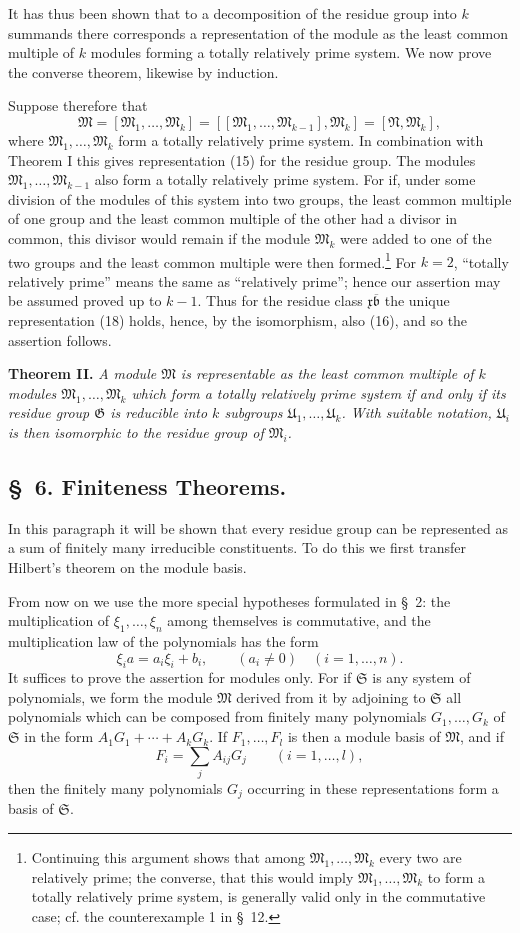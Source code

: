 \documentclass[11pt]{article}
\newcommand{\mM}{\mathfrak{M}}
\newcommand{\mN}{\mathfrak{N}}
\newcommand{\mG}{\mathfrak{G}}
\newcommand{\mb}{\mathfrak{b}}
\newcommand{\mx}{\mathfrak{x}}
\newcommand{\mU}{\mathfrak{U}}
\newcommand{\mS}{\mathfrak{S}}
\begin{document}
It has thus been shown that to a decomposition of the residue group into $k$ summands there corresponds a representation of the module as the least common multiple of $k$ modules forming a totally relatively prime system. We now prove the converse theorem, likewise by induction.

Suppose therefore that
\[
 \mM=[\mM_1,\ldots,\mM_k]=[[\mM_1,\ldots,\mM_{k-1}],\mM_k]=[\mN,\mM_k],
\]
where $\mM_1,
\ldots,\mM_k$ form a totally relatively prime system. In combination with Theorem I this gives representation (15) for the residue group. The modules $\mM_1,
\ldots,\mM_{k-1}$ also form a totally relatively prime system. For if, under some division of the modules of this system into two groups, the least common multiple of one group and the least common multiple of the other had a divisor in common, this divisor would remain if the module $\mM_k$ were added to one of the two groups and the least common multiple were then formed.\footnote{Continuing this argument shows that among $\mM_1,
\ldots,\mM_k$ every two are relatively prime; the converse, that this would imply $\mM_1,
\ldots,\mM_k$ to form a totally relatively prime system, is generally valid only in the commutative case; cf. the counterexample 1 in \S~12.} For $k=2$, ``totally relatively prime'' means the same as ``relatively prime''; hence our assertion may be assumed proved up to $k-1$. Thus for the residue class $\mx\overline{\mb}$ the unique representation (18) holds, hence, by the isomorphism, also (16), and so the assertion follows.

\textbf{Theorem II.} \emph{A module $\mM$ is representable as the least common multiple of $k$ modules $\mM_1,
\ldots,\mM_k$ which form a totally relatively prime system if and only if its residue group $\mG$ is reducible into $k$ subgroups $\mU_1,
\ldots,\mU_k$. With suitable notation, $\mU_i$ is then isomorphic to the residue group of $\mM_i$.}

\subsection*{\S~6. Finiteness Theorems.}

In this paragraph it will be shown that every residue group can be represented as a sum of finitely many irreducible constituents. To do this we first transfer Hilbert's theorem on the module basis.

From now on we use the more special hypotheses formulated in \S~2: the multiplication of $\xi_1,
\ldots,\xi_n$ among themselves is commutative, and the multiplication law of the polynomials has the form
\begin{equation}
 \xi_i a=a_i\xi_i+b_i,
 \qquad (a_i\ne0)\quad(i=1,\ldots,n).
\tag{6}
\end{equation}
It suffices to prove the assertion for modules only. For if $\mS$ is any system of polynomials, we form the module $\mM$ derived from it by adjoining to $\mS$ all polynomials which can be composed from finitely many polynomials $G_1,
\ldots,G_k$ of $\mS$ in the form $A_1G_1+
\cdots+A_kG_k$. If $F_1,
\ldots,F_l$ is then a module basis of $\mM$, and if
\[
 F_i=\sum_j A_{ij}G_j\qquad(i=1,\ldots,l),
\]
then the finitely many polynomials $G_j$ occurring in these representations form a basis of $\mS$.
\end{document}
